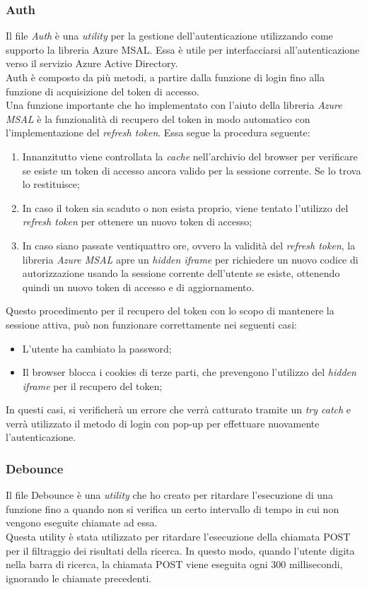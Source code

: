 \subsubsection{Auth}\label{subsubsec:auth-utils}
Il file \textit{Auth} è una \textit{utility} per la gestione dell'autenticazione utilizzando come supporto la libreria Azure MSAL. Essa è utile
per interfacciarsi all'autenticazione verso il servizio Azure Active Directory.\\
Auth è composto da più metodi, a partire dalla funzione di login fino alla funzione di acquisizione del token di accesso.\\
Una funzione importante che ho implementato con l'aiuto della libreria \textit{Azure MSAL} è la funzionalità di recupero del token in modo automatico con 
l'implementazione del \textit{refresh token}. Essa segue la procedura seguente:
\begin{enumerate}
  \item Innanzitutto viene controllata la \textit{cache} nell'archivio del browser per verificare se esiste un token di accesso ancora valido per la sessione corrente. Se lo trova lo restituisce;
  \item In caso il token sia scaduto o non esista proprio, viene tentato l'utilizzo del \textit{refresh token} per ottenere un nuovo token di accesso;
  \item In caso siano passate ventiquattro ore, ovvero la validità del \textit{refresh token}, la libreria \textit{Azure MSAL} apre un \textit{hidden iframe} per richiedere
  un nuovo codice di autorizzazione usando la sessione corrente dell'utente se esiste, ottenendo quindi un nuovo token di accesso e di aggiornamento. 
\end{enumerate}
Questo procedimento per il recupero del token con lo scopo di mantenere la sessione attiva, può non funzionare correttamente nei seguenti casi:
\begin{itemize}
  \item L'utente ha cambiato la password;
  \item Il browser blocca i cookies di terze parti, che prevengono l'utilizzo del \textit{hidden iframe} per il recupero del token;
\end{itemize}
In questi casi, si verificherà un errore che verrà catturato tramite un \textit{try catch} e verrà utilizzato il metodo di login con pop-up per effettuare nuovamente l'autenticazione.
\subsubsection{Debounce}\label{subsubsec:debounce}
Il file Debounce è una \textit{utility} che ho creato per ritardare l'esecuzione di una funzione fino a quando non si verifica
un certo intervallo di tempo in cui non vengono eseguite chiamate ad essa.\\
Questa utility è stata utilizzato per ritardare l'esecuzione della chiamata POST per il filtraggio dei risultati della ricerca. 
In questo modo, quando l'utente digita nella barra di ricerca, la chiamata POST viene eseguita ogni 300 millisecondi, ignorando le chiamate precedenti.

